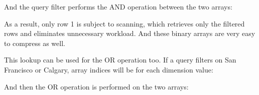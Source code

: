 \documentclass[letterpaper,10pt,english]{sphinxmanual}
\begin{document}
And the query filter performs the AND operation between the two arrays:

\begin{sphinxVerbatim}[commandchars=\\\{\}]
\PYG{p}{[}\PYG{p}{]}\PYG{p}{[}\PYG{p}{]}\PYG{p}{[}\PYG{p}{]}\PYG{p}{[}\PYG{p}{]}  \PYG{p}{[}\PYG{p}{]}\PYG{p}{[}\PYG{p}{]}\PYG{p}{[}\PYG{p}{]}\PYG{p}{[}\PYG{p}{]}  \PYG{p}{[}\PYG{p}{]}\PYG{p}{[}\PYG{p}{]}\PYG{p}{[}\PYG{p}{]}\PYG{p}{[}\PYG{p}{]}
\end{sphinxVerbatim}

As a result, only row 1 is subject to scanning, which retrieves only the filtered rows and eliminates unnecessary workload. And these binary arrays are very easy to compress as well.

This lookup can be used for the OR operation too. If a query filters on San Francisco or Calgary, array indices will be for each dimension value:

\begin{sphinxVerbatim}[commandchars=\\\{\}]
     \PYG{p}{[}\PYG{p}{]}  \PYG{p}{[}\PYG{p}{]}\PYG{p}{[}\PYG{p}{]}\PYG{p}{[}\PYG{p}{]}\PYG{p}{[}\PYG{p}{]}
    \PYG{p}{[}\PYG{p}{]}  \PYG{p}{[}\PYG{p}{]}\PYG{p}{[}\PYG{p}{]}\PYG{p}{[}\PYG{p}{]}\PYG{p}{[}\PYG{p}{]}
\end{sphinxVerbatim}

And then the OR operation is performed on the two arrays:

\begin{sphinxVerbatim}[commandchars=\\\{\}]
\PYG{p}{[}\PYG{p}{]}\PYG{p}{[}\PYG{p}{]}\PYG{p}{[}\PYG{p}{]}\PYG{p}{[}\PYG{p}{]}  \PYG{p}{[}\PYG{p}{]}\PYG{p}{[}\PYG{p}{]}\PYG{p}{[}\PYG{p}{]}\PYG{p}{[}\PYG{p}{]}  \PYG{p}{[}\PYG{p}{]}\PYG{p}{[}\PYG{p}{]}\PYG{p}{[}\PYG{p}{]}\PYG{p}{[}\PYG{p}{]}
\end{sphinxVerbatim}
\end{document}
